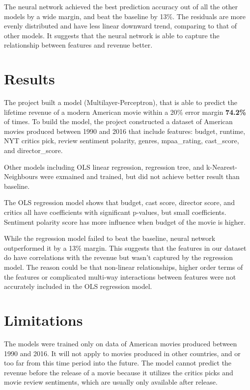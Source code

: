 \documentclass[11pt]{article}
\begin{document}
The neural network achieved the best prediction accuracy out of all the
other models by a wide margin, and beat the baseline by 13\%. The
residuals are more evenly distributed and have less linear downward
trend, comparing to that of other models. It suggests that the neural
network is able to capture the relationship between features and revenue better.

    \section{Results}\label{results}

The project built a model (Multilayer-Perceptron), that is able to
predict the lifetime revenue of a modern American movie within a 20\%
error margin \textbf{74.2\%} of times. To build the model, the project
constructed a dataset of American movies produced between 1990 and 2016
that include features: budget, runtime, NYT critics pick, review
sentiment polarity, genres, mpaa\_rating, cast\_score, and
director\_score.

Other models including OLS linear regression, regression tree, and
k-Nearest-Neighbours were exmained and trained, but did not achieve
better result than baseline.

The OLS regression model shows that budget, cast score, director score,
and critics all have coefficients with significant p-values, but small
coefficients. Sentiment polarity score has more influence when budget of
the movie is higher.

While the regression model failed to beat the baseline, neural network
outperformed it by a 13\% margin. This suggests that the features in our
dataset do have correlations with the revenue but wasn't captured by the
regression model. The reason could be that non-linear relationships,
higher order terms of the features or complicated multi-way interactions
between features were not accurately included in the OLS regression
model.

\section{Limitations}\label{limitations}

The models were trained only on data of American movies produced between
1990 and 2016. It will not apply to movies produced in other countries,
and or too far from this time period into the future. The model cannot
predict the revenue before the release of a movie because it utilizes
the critics picks and movie review sentiments, which are usually only
available after release.
\end{document}
